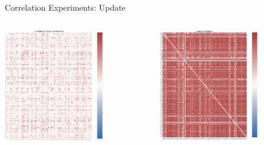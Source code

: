 \begin{frame}{Correlation Experiments: Update}
    \begin{columns}
        \begin{column}{0.5\textwidth}
            \centering
            \includegraphics[height=0.7\textheight,width=0.7\textwidth,keepaspectratio]{images/conf_corrs_heatmap.png}
        \end{column}
        \begin{column}{0.5\textwidth}
            \centering
            \includegraphics[height=0.7\textheight,width=0.7\textwidth,keepaspectratio]{images/logit_corrs_heatmap.png}
        \end{column}
    \end{columns}
\end{frame}
